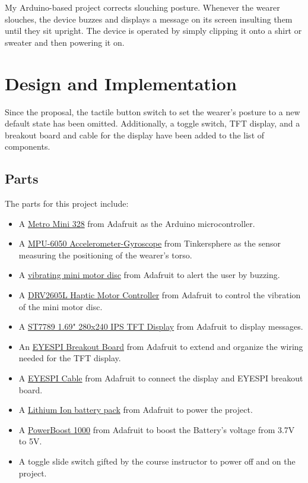 My Arduino-based project corrects slouching posture. Whenever the wearer slouches, the device buzzes and displays a message on its screen insulting them until they sit upright. The device is operated by simply clipping it onto a shirt or sweater and then powering it on.


\section*{Design and Implementation}

Since the proposal, the tactile button switch to set the wearer's posture to a new default state has been omitted. Additionally, a toggle switch, TFT display, and a breakout board and cable for the display have been added to the list of components.

\subsection*{Parts} %
The parts for this project include:
	\begin{itemize}
		\item A \href{https://www.adafruit.com/product/2590}{Metro Mini 328} from Adafruit as the Arduino microcontroller.
		\item A \href{https://tinkersphere.com/sensors/315--triple-axis-accelerometer-and-gyro-breakout-mpu-6050.html}{MPU-6050 Accelerometer-Gyroscope} from Tinkersphere as the sensor measuring the positioning of the wearer's torso.
		\item A \href{https://www.adafruit.com/product/1201}{vibrating mini motor disc} from Adafruit to alert the user by buzzing.
		\item A \href{https://www.adafruit.com/product/2305}{DRV2605L Haptic Motor Controller} from Adafruit to control the vibration of the mini motor disc.
		\item A \href{https://www.adafruit.com/product/5206}{ST7789 1.69" 280x240 IPS TFT Display} from Adafruit to display messages.
		\item An \href{https://www.adafruit.com/product/5613}{EYESPI Breakout Board} from Adafruit to extend and organize the wiring needed for the TFT display.
		\item A \href{https://www.adafruit.com/product/5239}{EYESPI Cable} from Adafruit to connect the display and EYESPI breakout board.
		\item A \href{https://www.adafruit.com/product/354}{Lithium Ion battery pack} from Adafruit to power the project.
		\item A \href{https://www.adafruit.com/product/2465}{PowerBoost 1000} from Adafruit to boost the Battery's voltage from 3.7V to 5V.
		\item A toggle slide switch gifted by the course instructor to power off and on the project.
	\end{itemize}


